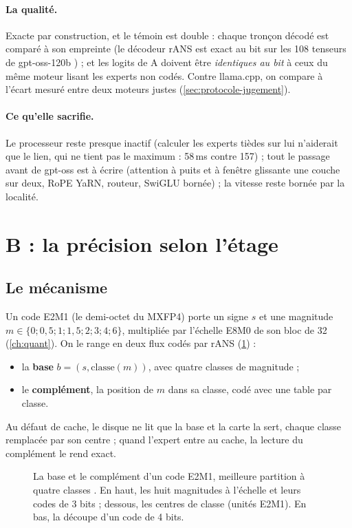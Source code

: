 \paragraph{La qualité.} Exacte par construction, et le témoin est double : chaque tronçon décodé est comparé à son empreinte (le décodeur rANS est exact au bit sur les 108 tenseurs de gpt-oss-120b \mes) ; et les logits de A doivent être \emph{identiques au bit} à ceux du même moteur lisant les experts non codés. Contre llama.cpp, on compare à l'écart mesuré entre deux moteurs justes (\cref{sec:protocole-jugement}).

\paragraph{Ce qu'elle sacrifie.} Le processeur reste presque inactif (calculer les experts tièdes sur lui n'aiderait que le lien, qui ne tient pas le maximum : 58\,ms contre 157) ; tout le passage avant de gpt-oss est à écrire (attention à puits et à fenêtre glissante une couche sur deux, RoPE YaRN, routeur, SwiGLU bornée) ; la vitesse reste bornée par la localité.

\section{B : la précision selon l'étage}\label{sec:archi-b}

\subsection{Le mécanisme}

Un code E2M1 (le demi-octet du MXFP4) porte un signe $s$ et une magnitude $m \in \{0 ; 0{,}5 ; 1 ; 1{,}5 ; 2 ; 3 ; 4 ; 6\}$, multipliée par l'échelle E8M0 de son bloc de 32 (\cref{ch:quant}). On le range en deux flux codés par rANS (\cref{fig:base-complement}) :
\begin{itemize}
\item la \textbf{base} $b = (s, \mathrm{classe}(m))$, avec quatre classes de magnitude ;
\item le \textbf{complément}, la position de $m$ dans sa classe, codé avec une table par classe.
\end{itemize}
Au défaut de cache, le disque ne lit que la base et la carte la sert, chaque classe remplacée par son centre ; quand l'expert entre au cache, la lecture du complément le rend exact.

\begin{figure}[ht]
\centering
\SchemaBaseComplement
\caption[La base et le complément d'un code E2M1]{La base et le complément d'un code E2M1, meilleure partition à quatre classes \mes. En haut, les huit magnitudes à l'échelle et leurs codes de 3 bits ; dessous, les centres de classe (unités E2M1). En bas, la découpe d'un code de 4 bits.}
\label{fig:base-complement}
\end{figure}


